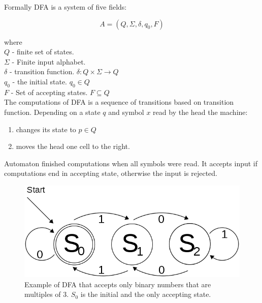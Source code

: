 \documentclass{article}
\begin{document}
\begin{itemize}
Formally DFA is a system of five fields:

\begin{equation}
	A = (Q, \Sigma, \delta, q_0, F)
\end{equation}

where \\
$Q$ - finite set of states. \\
$\Sigma$ - Finite input alphabet. \\
$\delta$ - transition function. $\delta: Q \times \Sigma \rightarrow Q$ \\
$q_0$ - the initial state. $q_0 \in Q$ \\
$F$ - Set of accepting states. $F \subseteq Q$ \\


The computations of DFA is a sequence of transitions based on transition function.
Depending on a state $q$ and symbol $x$ read by the head the machine:
\begin{enumerate}
	\item changes its state to $p \in Q$
	\item moves the head one cell to the right.
\end{enumerate}

Automaton finished computations when all symbols were read. It accepts input if computations end in accepting state, otherwise the input is rejected.



\end{itemize}


\begin{center}
	\begin{figure}[H]
		\begin{center}
		\includegraphics[scale=0.35]{images/automaton.png}
		\end{center}
		\caption{Example of DFA that accepts only binary numbers that are multiples of 3. $S_0$ is the initial and the only accepting state.}
	\end{figure}
\end{center}
\end{document}
